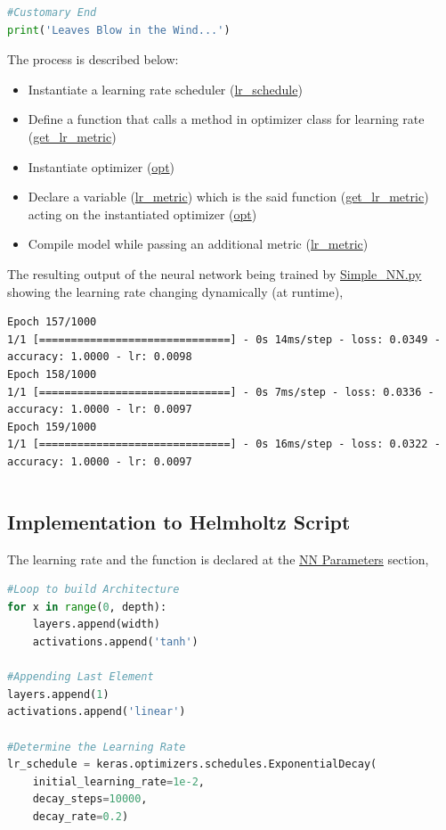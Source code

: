 \documentclass[a4paper, 12pt]{report}
\begin{document}
\begin{center}
\begin{lstlisting}[language=python]
#Customary End
print('Leaves Blow in the Wind...')
\end{lstlisting}
$$$$
The process is described below:
\begin{itemize}
\item Instantiate a learning rate scheduler (\url{lr_schedule})
\item Define a function that calls a method in optimizer class for learning rate (\url{get_lr_metric})
\item Instantiate optimizer (\url{opt})
\item Declare a variable (\url{lr_metric}) which is the said function (\url{get_lr_metric}) acting on the instantiated optimizer (\url{opt})
\item Compile model while passing an additional metric (\url{lr_metric})
\end{itemize}
$$$$
The resulting output of the neural network being trained by \url{Simple_NN.py} showing the learning rate changing dynamically (at runtime),
\begin{lstlisting}
Epoch 157/1000
1/1 [==============================] - 0s 14ms/step - loss: 0.0349 - accuracy: 1.0000 - lr: 0.0098
Epoch 158/1000
1/1 [==============================] - 0s 7ms/step - loss: 0.0336 - accuracy: 1.0000 - lr: 0.0097
Epoch 159/1000
1/1 [==============================] - 0s 16ms/step - loss: 0.0322 - accuracy: 1.0000 - lr: 0.0097
\end{lstlisting}
$$$$
\subsection{Implementation to Helmholtz Script}
The learning rate and the function is declared at the \url{NN Parameters} section,
\begin{lstlisting}[language=python]
#Loop to build Architecture
for x in range(0, depth):
    layers.append(width)  
    activations.append('tanh')

#Appending Last Element
layers.append(1) 
activations.append('linear')

#Determine the Learning Rate
lr_schedule = keras.optimizers.schedules.ExponentialDecay(
    initial_learning_rate=1e-2,
    decay_steps=10000,
    decay_rate=0.2)


\end{lstlisting}
\end{center}
\end{document}
